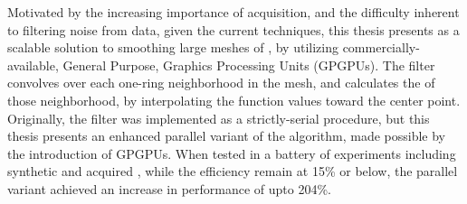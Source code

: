 Motivated by the increasing importance of \tdd{} acquisition, and the difficulty  inherent to filtering noise from data, given the current techniques, this thesis presents  as a scalable solution to smoothing large meshes of \tdd{}, by utilizing commercially-available, General Purpose, Graphics Processing Units (GPGPUs). The filter convolves over each one-ring neighborhood in the mesh, and calculates the  of those neighborhood, by interpolating the function values toward the center point. Originally, the filter was implemented as a strictly-serial procedure, but this thesis presents an enhanced parallel variant of the algorithm, made possible by the introduction of GPGPUs. When tested in a battery of experiments including synthetic and acquired \tdd{}, while the efficiency remain at 15\% or below, the parallel variant achieved an increase in performance of upto 204\%.

